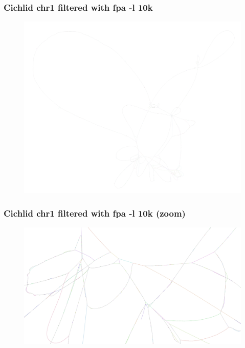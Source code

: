 \documentclass[aspectratio=169]{beamer}
\begin{document}
\begin{frame}
  \frametitle{Cichlid chr1 filtered with fpa -l 10k}
    \begin{figure}
      \includegraphics[scale=0.17,center]{seqwish-cichlid-chr1-fpal10k-1.png}
    \end{figure}
\end{frame}

\begin{frame}
  \frametitle{Cichlid chr1 filtered with fpa -l 10k (zoom)}
    \begin{figure}
      \includegraphics[scale=0.17,center]{seqwish-cichlid-chr1-fpal10k-2.png}
    \end{figure}
\end{frame}
\end{document}
